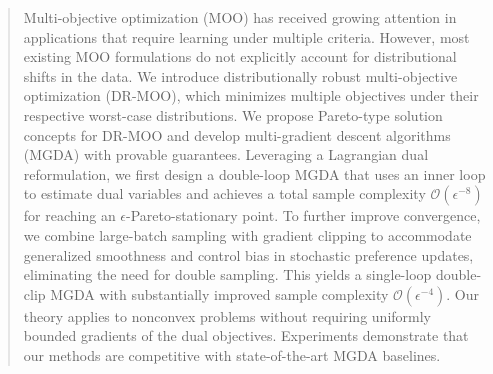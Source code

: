 \documentclass[twoside]{article} %
\theoremstyle{plain}
\theoremstyle{definition}
\theoremstyle{remark}
\begin{document}
\begin{abstract}
  Multi-objective optimization (MOO) has received growing attention in applications that require learning under multiple criteria. However, most existing MOO formulations do not explicitly account for distributional shifts in the data. We introduce distributionally robust multi-objective optimization (DR-MOO), which minimizes multiple objectives under their respective worst-case distributions. We propose Pareto-type solution concepts for DR-MOO and develop multi-gradient descent algorithms (MGDA) with provable guarantees. Leveraging a Lagrangian dual reformulation, we first design a double-loop MGDA that uses an inner loop to estimate dual variables and achieves a total sample complexity \(\mathcal{O}(\epsilon^{-8})\) for reaching an \(\epsilon\)-Pareto-stationary point. To further improve convergence, we combine large-batch sampling with gradient clipping to accommodate generalized smoothness and control bias in stochastic preference updates, eliminating the need for double sampling.  This yields a single-loop double-clip MGDA with substantially improved sample complexity \(\mathcal{O}(\epsilon^{-4})\). Our theory applies to nonconvex problems without requiring uniformly bounded gradients of the dual objectives. Experiments demonstrate that our methods are competitive with state-of-the-art MGDA baselines.
\end{abstract}
\end{document}
